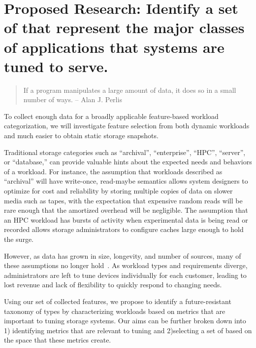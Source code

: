 \section{Proposed Research: Identify a set of \mWs that represent the major classes of applications that systems are tuned to serve.}
\begin{quote}
If a program manipulates a large amount of data, it does so in a small number of
ways.
-- Alan J. Perlis
\end{quote}


To collect enough data for a broadly applicable feature-based workload
categorization, we will investigate feature selection from both dynamic
workloads and much easier to obtain static storage snapshots.

Traditional storage categories such as 
``archival'', ``enterprise'', ``HPC'', ``server'', or ``database,'' can provide
valuable hints about the expected needs and behaviors of a workload.  For
instance, the assumption that workloads described as ``archival'' will have
write-once, read-maybe semantics allows system designers to optimize for cost
and reliability by storing multiple copies of data on slower media such as
tapes, with the expectation that expensive random reads will be rare enough that
the amortized overhead will be negligible.  The assumption that an HPC workload
has bursts of activity when experimental data is being read or recorded allows
storage administrators to configure caches large enough to hold the surge.

However, as data has grown in size, longevity, and number of sources, many of
these assumptions no longer hold~\cite{ian-tos,dwyer2012practical}.  As workload types and
requirements diverge, administrators are left to tune devices individually for
each customer, leading to lost revenue and lack of flexibility to quickly
respond to changing needs.  

Using our set of collected features, we propose to identify a future-resistant taxonomy
of \mW types by characterizing workloads based on metrics that are
important to tuning storage systems.  Our aims can be further broken down
into 1) identifying metrics that are relevant to tuning and 2)selecting a set of
\mws based on the space that these metrics create. 

